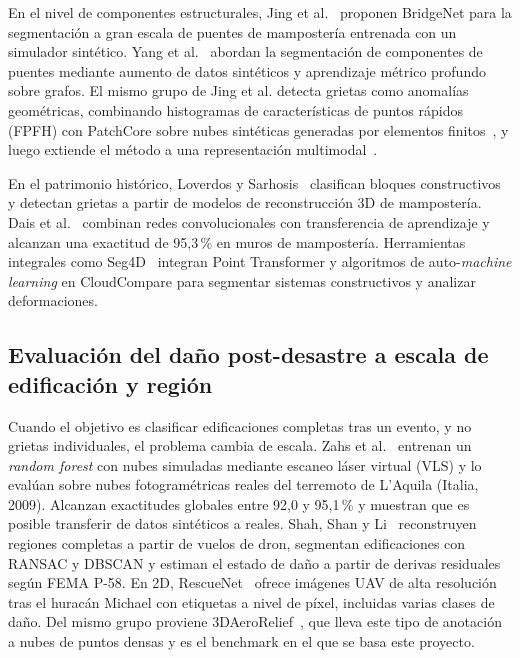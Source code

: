 \documentclass[5p]{elsarticle}
\begin{document}
En el nivel de componentes estructurales, Jing et al.~\cite{Jing2022} proponen BridgeNet para la segmentación a gran escala de puentes de mampostería entrenada con un simulador sintético. Yang et al.~\cite{Yang2023} abordan la segmentación de componentes de puentes mediante aumento de datos sintéticos y aprendizaje métrico profundo sobre grafos. El mismo grupo de Jing et al. detecta grietas como anomalías geométricas, combinando histogramas de características de puntos rápidos (FPFH) con PatchCore sobre nubes sintéticas generadas por elementos finitos~\cite{Jing2024}, y luego extiende el método a una representación multimodal~\cite{Jing2025}.

En el patrimonio histórico, Loverdos y Sarhosis~\cite{Loverdos2024} clasifican bloques constructivos y detectan grietas a partir de modelos de reconstrucción 3D de mampostería. Dais et al.~\cite{Dais2021} combinan redes convolucionales con transferencia de aprendizaje y alcanzan una exactitud de 95,3\,\% en muros de mampostería. Herramientas integrales como Seg4D~\cite{SanchezAparicio2025,SanzHonrado2026} integran Point Transformer y algoritmos de auto-\emph{machine learning} en CloudCompare para segmentar sistemas constructivos y analizar deformaciones.

\subsection{Evaluación del daño post-desastre a escala de edificación y región}

Cuando el objetivo es clasificar edificaciones completas tras un evento, y no grietas individuales, el problema cambia de escala. Zahs et al.~\cite{Zahs2023} entrenan un \emph{random forest} con nubes simuladas mediante escaneo láser virtual (VLS) y lo evalúan sobre nubes fotogramétricas reales del terremoto de L'Aquila (Italia, 2009). Alcanzan exactitudes globales entre 92,0 y 95,1\,\% y muestran que es posible transferir de datos sintéticos a reales. Shah, Shan y Li~\cite{Shah2025} reconstruyen regiones completas a partir de vuelos de dron, segmentan edificaciones con RANSAC y DBSCAN y estiman el estado de daño a partir de derivas residuales según FEMA P-58. En 2D, RescueNet~\cite{Rahnemoonfar2023} ofrece imágenes UAV de alta resolución tras el huracán Michael con etiquetas a nivel de píxel, incluidas varias clases de daño. Del mismo grupo proviene 3DAeroRelief~\cite{Le2026}, que lleva este tipo de anotación a nubes de puntos densas y es el benchmark en el que se basa este proyecto.
\end{document}
